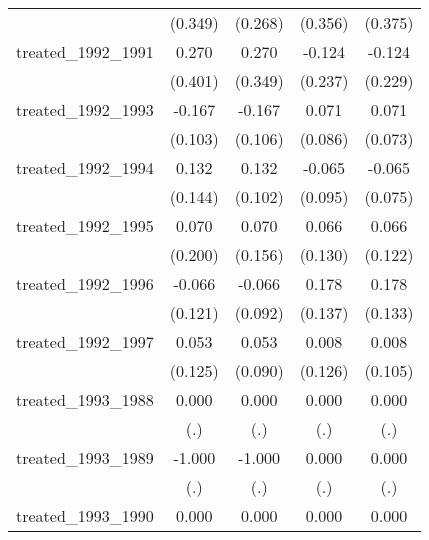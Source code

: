 {\begin{tabular}{l*{4}{c}}
            &     (0.349)         &     (0.268)         &     (0.356)         &     (0.375)         \\
[1em]
treated\_1992\_1991&       0.270         &       0.270         &      -0.124         &      -0.124         \\
            &     (0.401)         &     (0.349)         &     (0.237)         &     (0.229)         \\
[1em]
treated\_1992\_1993&      -0.167         &      -0.167         &       0.071         &       0.071         \\
            &     (0.103)         &     (0.106)         &     (0.086)         &     (0.073)         \\
[1em]
treated\_1992\_1994&       0.132         &       0.132         &      -0.065         &      -0.065         \\
            &     (0.144)         &     (0.102)         &     (0.095)         &     (0.075)         \\
[1em]
treated\_1992\_1995&       0.070         &       0.070         &       0.066         &       0.066         \\
            &     (0.200)         &     (0.156)         &     (0.130)         &     (0.122)         \\
[1em]
treated\_1992\_1996&      -0.066         &      -0.066         &       0.178         &       0.178         \\
            &     (0.121)         &     (0.092)         &     (0.137)         &     (0.133)         \\
[1em]
treated\_1992\_1997&       0.053         &       0.053         &       0.008         &       0.008         \\
            &     (0.125)         &     (0.090)         &     (0.126)         &     (0.105)         \\
[1em]
treated\_1993\_1988&       0.000         &       0.000         &       0.000         &       0.000         \\
            &         (.)         &         (.)         &         (.)         &         (.)         \\
[1em]
treated\_1993\_1989&      -1.000         &      -1.000         &       0.000         &       0.000         \\
            &         (.)         &         (.)         &         (.)         &         (.)         \\
[1em]
treated\_1993\_1990&       0.000         &       0.000         &       0.000         &       0.000         \\

\end{tabular}}
